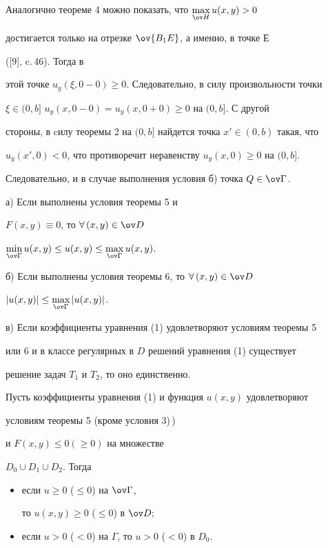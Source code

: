 Аналогично теореме 4 можно показать, что $\max\limits_{\ov H}u(x,y)>0$


достигается только на отрезке $\ov {B_1E}$, а именно, в точке $Е$


([9], c.\,46). Тогда в


этой точке $u_y(\xi,0-0)\ge 0$. Следовательно, в силу произвольности точки


$\xi \in (0,b]$\; $u_y(x,0-0)=u_y(x,0+0)\ge 0$ на $(0,b]$. С другой 


стороны, в cилу теоремы 2 на $(0,b]$ найдется точка $x'\in (0,b)$ такая, что 


$u_y(x',0)<0$, что противоречит неравенству $u_y(x,0)\ge 0$ на $(0,b]$.


Следовательно, и в случае выполнения условия б) точка $Q\in \ov \Gamma$.





\begin{cor}


а) Если выполнены условия теоремы 5 и 


$F(x,y)\equiv 0$, то $\forall\, (x,y)\in \ov D$\;


$\min\limits_{\ov \Gamma} u(x,y)\le u(x,y)\le \max \limits_{\ov \Gamma} 


u(x,y)$.





б) Если выполнены условия теоремы 6, то $\forall\,(x,y)\in \ov D$\;


$|u(x,y)|\le \max \limits_{\ov \Gamma} |u(x,y)|$.





в) Если коэффициенты уравнения (1) удовлетворяют условиям теоремы 5 


или 6 и в классе регулярных в $D$ решений уравнения (1) существует


решение задач $T_1$ и $T_2$, то оно единственно.


\end{cor}





\begin{cor}


Пусть коэффициенты уравнения (1) и функция $u(x,y)$  удовлетворяют 


условиям теоремы 5 (кроме условия 3)\,)


и $F(x,y)\le 0 (\ge 0)$ на множестве 


$D_0\cup D_1\cup D_2$. Тогда 


\begin{itemize}


\item[а)] если $u\ge 0$ ($\le 0$) на $\ov\Gamma$,


то $u(x,y)\ge 0$ ($\le 0$) в $\ov D;$


\item[б)] если $u>0$ ($<0$) на $\Gamma$, то $u>0$ ($<0$) в $D_0$.


\end{itemize}


\end{cor}





